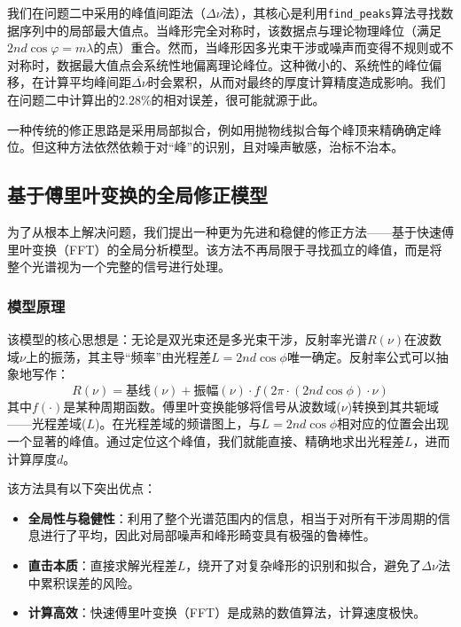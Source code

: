 \documentclass[withoutpreface,bwprint]{cumcmthesis} %
\begin{document}
我们在问题二中采用的峰值间距法（$\Delta\nu$法），其核心是利用\texttt{find\_peaks}算法寻找数据序列中的局部最大值点。当峰形完全对称时，该数据点与理论物理峰位（满足$2nd\cos\varphi=m\lambda$的点）重合。然而，当峰形因多光束干涉或噪声而变得不规则或不对称时，数据最大值点会系统性地偏离理论峰位。这种微小的、系统性的峰位偏移，在计算平均峰间距$\overline{\Delta\nu}$时会累积，从而对最终的厚度计算精度造成影响。我们在问题二中计算出的$2.28\%$的相对误差，很可能就源于此。

一种传统的修正思路是采用局部拟合，例如用抛物线拟合每个峰顶来精确确定峰位。但这种方法依然依赖于对“峰”的识别，且对噪声敏感，治标不治本。

\subsection{基于傅里叶变换的全局修正模型}

为了从根本上解决问题，我们提出一种更为先进和稳健的修正方法——基于快速傅里叶变换（FFT）的全局分析模型。该方法不再局限于寻找孤立的峰值，而是将整个光谱视为一个完整的信号进行处理。

\subsubsection{模型原理}
该模型的核心思想是：无论是双光束还是多光束干涉，反射率光谱$R(\nu)$在波数域$\nu$上的振荡，其主导“频率”由光程差$L = 2nd\cos\phi$唯一确定。反射率公式可以抽象地写作：
$$
    R(\nu) = \text{基线}(\nu) + \text{振幅}(\nu) \cdot f(2\pi \cdot (2nd\cos\phi) \cdot \nu)
$$
其中$f(\cdot)$是某种周期函数。傅里叶变换能够将信号从波数域($\nu$)转换到其共轭域——光程差域($L$)。在光程差域的频谱图上，与$L=2nd\cos\phi$相对应的位置会出现一个显著的峰值。通过定位这个峰值，我们就能直接、精确地求出光程差$L$，进而计算厚度$d$。

该方法具有以下突出优点：
\begin{itemize}
    \item \textbf{全局性与稳健性}：利用了整个光谱范围内的信息，相当于对所有干涉周期的信息进行了平均，因此对局部噪声和峰形畸变具有极强的鲁棒性。
    \item \textbf{直击本质}：直接求解光程差$L$，绕开了对复杂峰形的识别和拟合，避免了$\Delta\nu$法中累积误差的风险。
    \item \textbf{计算高效}：快速傅里叶变换（FFT）是成熟的数值算法，计算速度极快。
\end{itemize}
\end{document}
